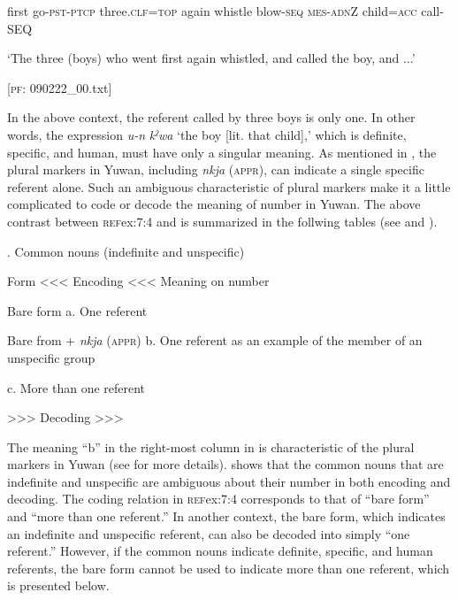     first  go-\textsc{pst}-\textsc{ptcp}  three.\textsc{clf}=\textsc{top}    again  whistle  blow-\textsc{seq}  \textsc{mes}-\textsc{adn}Z  child=\textsc{acc}  call-SEQ

    ‘The three (boys) who went first again whistled, and called the boy, and ...’

    [\textsc{pf}: 090222\_00.txt]
\z

In the above context, the referent called by three boys is only one. In other words, the expression \textit{u-n} \textit{kˀwa} ‘the boy [lit. that child],’ which is definite, specific, and human, must have only a singular meaning. As mentioned in , the plural markers in Yuwan, including \textit{nkja} (\textsc{appr}), can indicate a single specific referent alone. Such an ambiguous characteristic of plural markers make it a little complicated to code or decode the meaning of number in Yuwan. The above contrast between \textsc{ref}{ex:7:4} and  is summarized in the follwing tables (see  and ).

\begin{styleBeschriftung}
\textmd{}\textmd{. Common nouns (indefinite and unspecific)}
\end{styleBeschriftung}

Form  <<< Encoding <<<  Meaning on number

Bare form  %
a. One referent

Bare from + \textit{nkja} (\textsc{appr})  %
b. One referent as an example of the member of an unspecific group

c. More than one referent

  >>> Decoding >>>  

The meaning “b” in the right-most column in  is characteristic of the plural markers in Yuwan (see  for more details).  shows that the common nouns that are indefinite and unspecific are ambiguous about their number in both encoding and decoding. The coding relation in \textsc{ref}{ex:7:4} corresponds to that of “bare form” and “more than one referent.” In another context, the bare form, which indicates an indefinite and unspecific referent, can also be decoded into simply “one referent.” However, if the common nouns indicate definite, specific, and human referents, the bare form cannot be used to indicate more than one referent, which is presented below.

